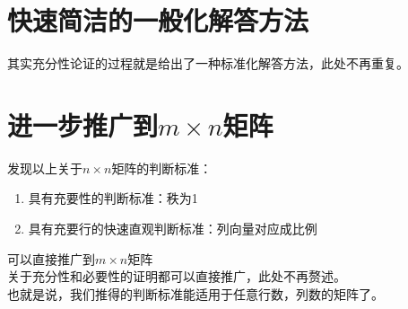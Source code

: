 \documentclass[UTF-8,a4paper]{ctexart}
\begin{document}
\section{快速简洁的一般化解答方法}
其实充分性论证的过程就是给出了一种标准化解答方法，此处不再重复。

\section{进一步推广到\(m \times n\)矩阵}
发现以上关于\(n \times n\)矩阵的判断标准：
\kaishu
\begin{enumerate}
    \item 具有充要性的判断标准：秩为1
    \item 具有充要行的快速直观判断标准：列向量对应成比例
\end{enumerate}
\songti
可以直接推广到\(m \times n\)矩阵
\\关于充分性和必要性的证明都可以直接推广，此处不再赘述。
\\也就是说，我们推得的判断标准能适用于任意行数，列数的矩阵了。
\end{document}
